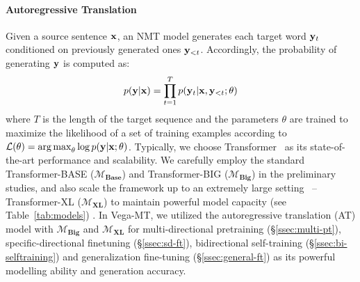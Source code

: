 \documentclass[11pt,a4paper]{article}
\DeclareMathOperator*{\argmax}{arg\,max}
\newcommand{\zct}{\color{black}}
\begin{document}
\paragraph{Autoregressive Translation}
Given a source sentence $\bf x$, an NMT model generates each target word ${\bf y}_t$ conditioned on previously generated ones ${\bf y}_{<t}$. Accordingly, the probability of generating $\bf y$ is computed as:
\begin{equation}
    p({\bf y}|{\bf x})
    =\prod_{t=1}^{T}p({\bf y}_t|{\bf x},{\bf y}_{<t}; \theta)
    \label{eq:standard}
\end{equation}
where $T$ is the length of the target sequence and the parameters $\theta$ are trained to maximize the likelihood of a set of training examples according to $\mathcal{L}(\theta) = \argmax_{\theta} \log p({\bf y}|{\bf x}; \theta)$. Typically, we choose Transformer~\cite{transformer} as its state-of-the-art performance and scalability. We carefully employ the standard Transformer-\textsc{BASE} ($\mathcal{M}_{\textbf{Base}}$) and Transformer-\textsc{BIG} ($\mathcal{M}_{\textbf{Big}}$) in the preliminary studies, and also scale the framework up to an extremely large setting~\cite{facebook2021} -- Transformer-\textsc{XL} ($\mathcal{M}_{\textbf{XL}}$) to maintain powerful model capacity {\zct (see Table~\ref{tab:models}) }.
In Vega-MT, we utilized {\zct the} autoregressive translation (AT) model with $\mathcal{M}_{\textbf{Big}}$ and $\mathcal{M}_{\textbf{XL}}$ for {multi-directional pretraining} (\S\ref{ssec:multi-pt}), {specific-directional finetuning} (\S\ref{ssec:sd-ft}), {bidirectional self-training} (\S\ref{ssec:bi-selftraining}) and {generalization fine-tuning} (\S\ref{ssec:general-ft}) as its powerful modelling ability and generation accuracy.
\end{document}
